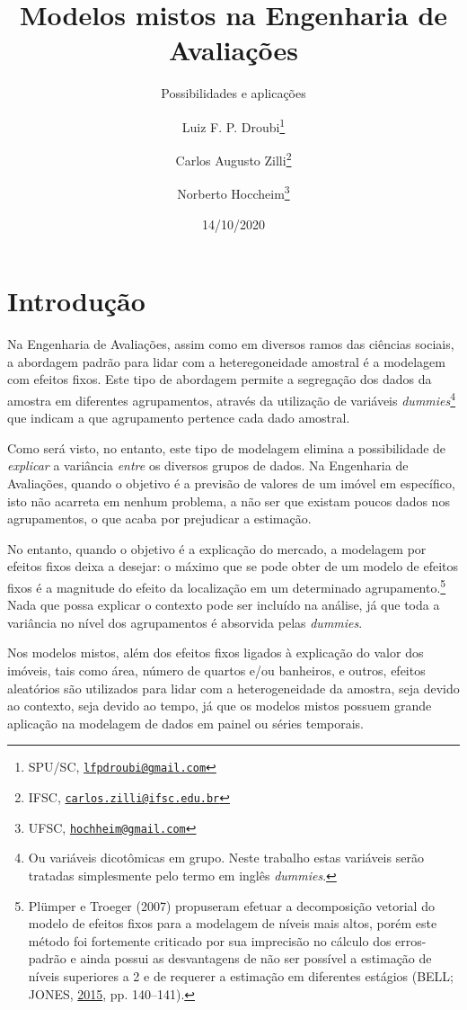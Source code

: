 \documentclass[
  a4paper, 11pt]{article}
\title{Modelos mistos na Engenharia de Avaliações}
\subtitle{Possibilidades e aplicações}
\author{Luiz F. P. Droubi\footnote{SPU/SC,
  \href{mailto:lfpdroubi@gmail.com}{\nolinkurl{lfpdroubi@gmail.com}}} \and Carlos Augusto Zilli\footnote{IFSC,
  \href{mailto:carlos.zilli@ifsc.edu.br}{\nolinkurl{carlos.zilli@ifsc.edu.br}}} \and Norberto Hoccheim\footnote{UFSC,
  \href{mailto:hochheim@gmail.com}{\nolinkurl{hochheim@gmail.com}}}}
\date{14/10/2020}
\begin{document}
\maketitle

\hypertarget{introduuxe7uxe3o}{%
\section{Introdução}\label{introduuxe7uxe3o}}

Na Engenharia de Avaliações, assim como em diversos ramos das ciências
sociais, a abordagem padrão para lidar com a heteregoneidade amostral é
a modelagem com efeitos fixos. Este tipo de abordagem permite a
segregação dos dados da amostra em diferentes agrupamentos, através da
utilização de variáveis \emph{dummies}\footnote{Ou variáveis dicotômicas
  em grupo. Neste trabalho estas variáveis serão tratadas simplesmente
  pelo termo em inglês \emph{dummies}.} que indicam a que agrupamento
pertence cada dado amostral.

Como será visto, no entanto, este tipo de modelagem elimina a
possibilidade de \emph{explicar} a variância \emph{entre} os diversos
grupos de dados. Na Engenharia de Avaliações, quando o objetivo é a
previsão de valores de um imóvel em específico, isto não acarreta em
nenhum problema, a não ser que existam poucos dados nos agrupamentos, o
que acaba por prejudicar a estimação.

No entanto, quando o objetivo é a explicação do mercado, a modelagem por
efeitos fixos deixa a desejar: o máximo que se pode obter de um modelo
de efeitos fixos é a magnitude do efeito da localização em um
determinado agrupamento.\footnote{Plümper e Troeger (2007) propuseram
  efetuar a decomposição vetorial do modelo de efeitos fixos para a
  modelagem de níveis mais altos, porém este método foi fortemente
  criticado por sua imprecisão no cálculo dos erros-padrão e ainda
  possui as desvantagens de não ser possível a estimação de níveis
  superiores a 2 e de requerer a estimação em diferentes estágios (BELL;
  JONES, \protect\hyperlink{ref-bell2015}{2015}, pp. 140--141).} Nada
que possa explicar o contexto pode ser incluído na análise, já que toda
a variância no nível dos agrupamentos é absorvida pelas \emph{dummies}.

Nos modelos mistos, além dos efeitos fixos ligados à explicação do valor
dos imóveis, tais como área, número de quartos e/ou banheiros, e outros,
efeitos aleatórios são utilizados para lidar com a heterogeneidade da
amostra, seja devido ao contexto, seja devido ao tempo, já que os
modelos mistos possuem grande aplicação na modelagem de dados em painel
ou séries temporais.
\end{document}
